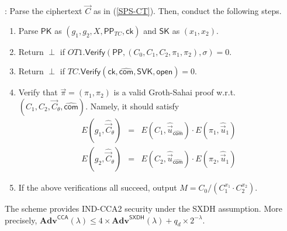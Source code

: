\documentclass[10pt]{llncs}
\newcommand{\Adv}{\mathbf{Adv}}
\newcommand{\SK}{\mathsf{SK}}
\newcommand{\PK}{\mathsf{PK}}
\newcommand{\SVK}{\mathsf{SVK}}
\newcommand{\ck}{\mathsf{ck}}
\newcommand{\com}{\hat{\mathsf{com}}}
\newcommand{\open}{\mathsf{open}}
\newcommand{\wrt}{\textrm{w.r.t.} }
\newcommand{\Dec}{{\mathsf{Decrypt}}}
\newcommand{\Verif}{{\mathsf{Verify}}}
\newcommand{\PPP}{\mathsf{PP}}
\begin{document}
\begin{description}
\begin{enumerate}
    
  \end{enumerate}
  
\item[\boldmath{$\Dec(\PK, \vec{C}, \SK)$}]: Parse the ciphertext $\vec{C}$ as in (\ref{SPS-CT}). Then, conduct the following steps. \smallskip  \smallskip   
  \begin{enumerate}
  \item Parse $\PK$ as $({g}_1, {g}_2, X, \PPP_{TC}, \ck)$ and $\SK$ as $(x_1, x_2)$.
  \item Return $\perp$ if $OT1.\Verif(\PPP,  (C_0, C_1, C_2, \pi_1,\pi_2), \sigma) = 0$.
  \item Return $\perp$ if  $TC.\Verif(\ck, \com, \SVK, \open) = 0$.
  \item Verify that $\vec{\pi}=(\pi_1,\pi_2)$ is a valid Groth-Sahai proof \wrt  $(C_1, C_2, \vec{C}_{\theta}, \com)$. Namely, 
    it should satisfy 
    \begin{eqnarray} \label{ver-eq} 
      E(g_1,\hat{\vec{C}}_{\theta}) &=& E(C_1 , \hat{\vec{u}}_{\com}) \cdot E(\pi_1,\hat{\vec{u}}_1) \\ \nonumber
      E(g_2,\hat{\vec{C}}_{\theta}) &=& E(C_2 , \hat{\vec{u}}_{\com}) \cdot E(\pi_2,\hat{\vec{u}}_1)
    \end{eqnarray}
  \item If  the above verifications all succeed, output $M=C_0/(C_1^{x_1}\cdot C_2^{x_2})$. \medskip \smallskip \smallskip 
  \end{enumerate}
  
\end{description}

\medskip 

\begin{theorem} \label{thm-SXDH}
  The scheme provides IND-CCA2 security under the SXDH assumption.
  More precisely,
  $\Adv^{\mathsf{CCA}}(\lambda)\leq 4\times\Adv^{\mathsf{SXDH}}(\lambda)
  + q_d \times 2^{-\lambda}$.
\end{theorem}
\end{document}
